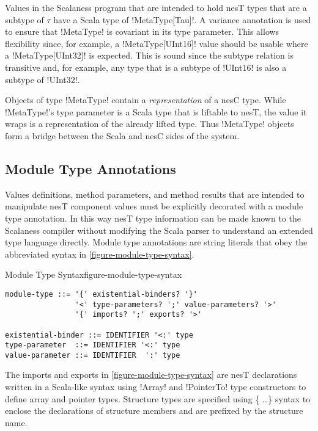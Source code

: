 Values in the Scalaness program that are intended to hold nesT types that are a subtype of
$\tau$ have a Scala type of !MetaType[Tau]!. A variance annotation is used to ensure that
!MetaType! is covariant in its type parameter. This allows flexibility since, for example, a
!MetaType[UInt16]! value should be usable where a !MetaType[UInt32]! is expected. This is sound
since the subtype relation is transitive and, for example, any type that is a subtype of
!UInt16! is also a subtype of !UInt32!.

Objects of type !MetaType! contain a \emph{representation} of a nesC type. While !MetaType!'s
type parameter is a Scala type that is liftable to nesT, the value it wraps is a representation
of the already lifted type. Thus !MetaType! objects form a bridge between the Scala and nesC
sides of the system.


\subsection{Module Type Annotations}
\label{section-module-type}

Values definitions, method parameters, and method results that are intended to manipulate nesT
component values must be explicitly decorated with a module type annotation. In this way nesT
type information can be made known to the Scalaness compiler without modifying the Scala parser
to understand an extended type language directly. Module type annotations are string literals
that obey the abbreviated syntax in \autoref{figure-module-type-syntax}.

\singlespace
\begin{fpfig}[tbhp]{Module Type Syntax}{figure-module-type-syntax}
{
\begin{Verbatim}
module-type ::= '{' existential-binders? '}'
                '<' type-parameters? ';' value-parameters? '>'
                '{' imports? ';' exports? '>'

existential-binder ::= IDENTIFIER '<:' type
type-parameter  ::= IDENTIFIER '<:' type
value-parameter ::= IDENTIFIER  ':' type
\end{Verbatim}
}
\end{fpfig}
\primaryspacing

The imports and exports in \autoref{figure-module-type-syntax} are nesT declarations written in
a Scala-like syntax using !Array! and !PointerTo! type constructors to define array and pointer
types. Structure types are specified using \{ \ldots \} syntax to enclose the declarations of
structure members and are prefixed by the structure name.

